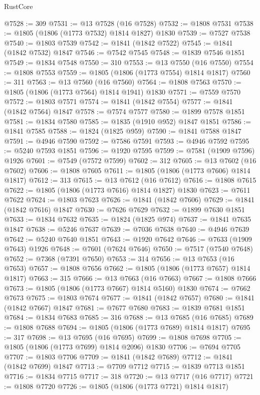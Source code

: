 \begin{lexlean}{RustCore}
\begin{coremodule}
@7528 := 309
@7531 := @13 @7528 (@16 @7528)
@7532 := @1808 @7531
@7538 := @1805 (@1806 (@1773 @7532) @1814 @1827) @1830
@7539 := @7527 @7538
@7540 := @1803 @7539
@7542 := @1841 (@1842 @7522)
@7545 := @1841 (@1842 @7532) @1847
@7546 := @7542 @7545
@7548 := @1839 @7546 @1851
@7549 := @1834 @7548
@7550 := 310
@7553 := @13 @7550 (@16 @7550)
@7554 := @1808 @7553
@7559 := @1805 (@1806 (@1773 @7554) @1814 @1817)
@7560 := 311
@7563 := @13 @7560 (@16 @7560)
@7564 := @1808 @7563
@7570 := @1805 (@1806 (@1773 @7564) @1814 @1941) @1830
@7571 := @7559 @7570
@7572 := @1803 @7571
@7574 := @1841 (@1842 @7554)
@7577 := @1841 (@1842 @7564) @1847
@7578 := @7574 @7577
@7580 := @1899 @7578 @1851
@7581 := @1834 @7580
@7585 := @1835 (@1910 @952) @1847 @1851
@7586 := @1841 @7585
@7588 := @1824 (@1825 @959)
@7590 := @1841 @7588 @1847
@7591 := @4946 @7590
@7592 := @7586 @7591
@7593 := @4946 @7592
@7595 := @5240 @7593 @1851
@7596 := @1920 @7595
@7599 := @7581 (@1909 @7596) @1926
@7601 := @7549 (@7572 @7599)
@7602 := 312
@7605 := @13 @7602 (@16 @7602)
@7606 := @1808 @7605
@7611 := @1805 (@1806 (@1773 @7606) @1814 @1817)
@7612 := 313
@7615 := @13 @7612 (@16 @7612)
@7616 := @1808 @7615
@7622 := @1805 (@1806 (@1773 @7616) @1814 @1827) @1830
@7623 := @7611 @7622
@7624 := @1803 @7623
@7626 := @1841 (@1842 @7606)
@7629 := @1841 (@1842 @7616) @1847
@7630 := @7626 @7629
@7632 := @1899 @7630 @1851
@7633 := @1834 @7632
@7635 := @1824 (@1825 @974)
@7637 := @1841 @7635 @1847
@7638 := @5246 @7637
@7639 := @7036 @7638
@7640 := @4946 @7639
@7642 := @5240 @7640 @1851
@7643 := @1920 @7642
@7646 := @7633 (@1909 @7643) @1926
@7648 := @7601 (@7624 @7646)
@7650 := @7517 (@7540 @7648)
@7652 := @7368 (@7391 @7650)
@7653 := 314
@7656 := @13 @7653 (@16 @7653)
@7657 := @1808 @7656
@7662 := @1805 (@1806 (@1773 @7657) @1814 @1817)
@7663 := 315
@7666 := @13 @7663 (@16 @7663)
@7667 := @1808 @7666
@7673 := @1805 (@1806 (@1773 @7667) @1814 @5160) @1830
@7674 := @7662 @7673
@7675 := @1803 @7674
@7677 := @1841 (@1842 @7657)
@7680 := @1841 (@1842 @7667) @1847
@7681 := @7677 @7680
@7683 := @1839 @7681 @1851
@7684 := @1834 @7683
@7685 := 316
@7688 := @13 @7685 (@16 @7685)
@7689 := @1808 @7688
@7694 := @1805 (@1806 (@1773 @7689) @1814 @1817)
@7695 := 317
@7698 := @13 @7695 (@16 @7695)
@7699 := @1808 @7698
@7705 := @1805 (@1806 (@1773 @7699) @1814 @2096) @1830
@7706 := @7694 @7705
@7707 := @1803 @7706
@7709 := @1841 (@1842 @7689)
@7712 := @1841 (@1842 @7699) @1847
@7713 := @7709 @7712
@7715 := @1839 @7713 @1851
@7716 := @1834 @7715
@7717 := 318
@7720 := @13 @7717 (@16 @7717)
@7721 := @1808 @7720
@7726 := @1805 (@1806 (@1773 @7721) @1814 @1817)

\end{coremodule}
\end{lexlean}
